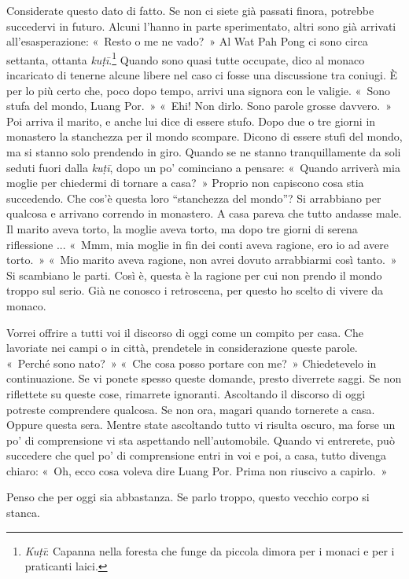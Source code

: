 Considerate questo dato di fatto. Se non ci siete già passati finora,
potrebbe succedervi in futuro. Alcuni l'hanno in parte sperimentato,
altri sono già arrivati all'esasperazione: «~Resto o me ne vado?~» Al
Wat Pah Pong ci sono circa settanta, ottanta \emph{kuṭī}.\footnote{\emph{Kuṭī}:
  Capanna nella foresta che funge da piccola dimora per i monaci e per i
  praticanti laici.} Quando sono quasi tutte occupate, dico al monaco
incaricato di tenerne alcune libere nel caso ci fosse una discussione
tra coniugi. È per lo più certo che, poco dopo tempo, arrivi una signora
con le valigie. «~Sono stufa del mondo, Luang Por.~» «~Ehi! Non dirlo.
Sono parole grosse davvero.~» Poi arriva il marito, e anche lui dice di
essere stufo. Dopo due o tre giorni in monastero la stanchezza per il
mondo scompare. Dicono di essere stufi del mondo, ma si stanno solo
prendendo in giro. Quando se ne stanno tranquillamente da soli seduti
fuori dalla \emph{kuṭī}, dopo un po' cominciano a pensare: «~Quando
arriverà mia moglie per chiedermi di tornare a casa?~» Proprio non
capiscono cosa stia succedendo. Che cos'è questa loro ``stanchezza del
mondo''? Si arrabbiano per qualcosa e arrivano correndo in monastero. A
casa pareva che tutto andasse male. Il marito aveva torto, la moglie
aveva torto, ma dopo tre giorni di serena riflessione ... «~Mmm, mia
moglie in fin dei conti aveva ragione, ero io ad avere torto.~» «~Mio
marito aveva ragione, non avrei dovuto arrabbiarmi così tanto.~» Si
scambiano le parti. Così è, questa è la ragione per cui non prendo il
mondo troppo sul serio. Già ne conosco i retroscena, per questo ho
scelto di vivere da monaco.

Vorrei offrire a tutti voi il discorso di oggi come un compito per casa.
Che lavoriate nei campi o in città, prendetele in considerazione queste
parole. «~Perché sono nato?~» «~Che cosa posso portare con me?~»
Chiedetevelo in continuazione. Se vi ponete spesso queste domande,
presto diverrete saggi. Se non riflettete su queste cose, rimarrete
ignoranti. Ascoltando il discorso di oggi potreste comprendere qualcosa.
Se non ora, magari quando tornerete a casa. Oppure questa sera. Mentre
state ascoltando tutto vi risulta oscuro, ma forse un po' di
comprensione vi sta aspettando nell'automobile. Quando vi entrerete, può
succedere che quel po' di comprensione entri in voi e poi, a casa, tutto
divenga chiaro: «~Oh, ecco cosa voleva dire Luang Por. Prima non
riuscivo a capirlo.~»

Penso che per oggi sia abbastanza. Se parlo troppo, questo vecchio corpo
si stanca.

